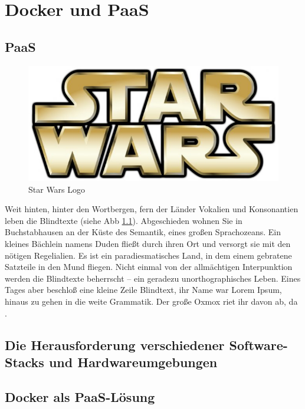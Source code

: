 \chapter{Docker und PaaS}
\label{cha:docker_und_paas}


\section{PaaS}
\label{sec:paas}
\begin{figure}[htb]
  \centering  
  \includegraphics[scale=0.5]{img/starwars.jpg}
  \caption{Star Wars Logo}
  \label{fig:starwars}
\end{figure}
Weit hinten, hinter den Wortbergen, fern der Länder Vokalien und Konsonantien leben die Blindtexte (siehe Abb \ref{fig:starwars}). Abgeschieden wohnen Sie in Buchstabhausen an der Küste des Semantik, eines großen Sprachozeans. Ein kleines Bächlein namens Duden fließt durch ihren Ort und versorgt sie mit den nötigen Regelialien. Es ist ein paradiesmatisches Land, in dem einem gebratene Satzteile in den Mund fliegen. Nicht einmal \cite{schroder_container-virtualisierung_2014} von der allmächtigen Interpunktion werden die Blindtexte beherrscht – ein geradezu unorthographisches Leben. Eines Tages aber beschloß eine kleine Zeile Blindtext, ihr Name war Lorem Ipsum, hinaus zu gehen in die weite Grammatik. Der große Oxmox riet ihr davon ab, da \cite[S. 100]{rudolph_servicebasierte_2009}.

\section{Die Herausforderung verschiedener Software-Stacks und Hardwareumgebungen}
\label{sec:matrix_of_hell}

\section{Docker als PaaS-Lösung}
\label{sec:docker_als_paasLösung}
